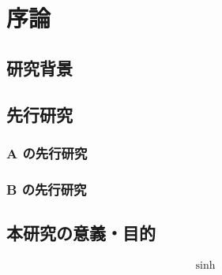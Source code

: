 
\chapter{序論}
\label{ch:introduction}


\section{研究背景}
\label{sec:background}


\section{先行研究}
\label{sec:previous}

\subsection{A の先行研究}
\label{ssec:previous_A}

\subsection{B の先行研究}
\label{ssec:previous_B}


\section{本研究の意義・目的}
\label{sec:objective}

\begin{align}
    \sinh
\end{align}